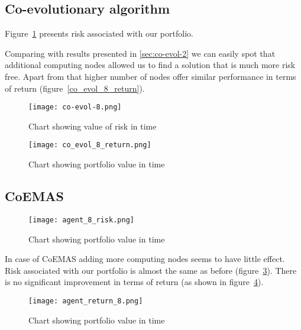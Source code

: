 \subsection{Co-evolutionary algorithm}

Figure~\ref{fig:co_evol_8_risk} presents risk associated with our portfolio.


Comparing with results presented in \ref{sec:co-evol-2} we can easily spot that additional computing nodes allowed us to find a solution that is much more risk free.
Apart from that higher number of nodes offer similar performance in terms of return (figure~\ref{co_evol_8_return}).

\begin{figure}[ht]
  \begin{center}
    \texttt{[image: co-evol-8.png]}
  \end{center}
  \caption{Chart showing value of risk in time}
  \label{fig:co_evol_8_risk}
\end{figure}

\begin{figure}[ht]
  \begin{center}
    \texttt{[image: co\_evol\_8\_return.png]}
  \end{center}
  \caption{Chart showing portfolio value in time}
  \label{fig:co_evol_8_return}
\end{figure}

\subsection{CoEMAS}

\begin{figure}[ht]
  \begin{center}
    \texttt{[image: agent\_8\_risk.png]}
  \end{center}
  \caption{Chart showing portfolio value in time}
  \label{fig:agent_8_risk}
\end{figure}

In case of CoEMAS adding more computing nodes seems to have little effect.
Risk associated with our portfolio is almost the same as before (figure~\ref{fig:agent_8_risk}).
There is no significant improvement in terms of return (as shown in figure~\ref{fig:agent_8_return}). 


\begin{figure}[ht]
  \begin{center}
    \texttt{[image: agent\_return\_8.png]}
  \end{center}
  \caption{Chart showing portfolio value in time}
  \label{fig:agent_8_return}
\end{figure}

